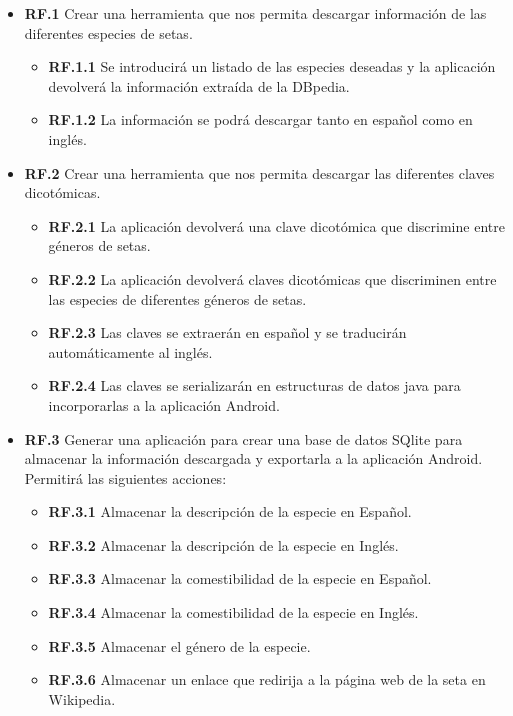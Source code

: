 \begin{itemize}
	\item \textbf{RF.1} Crear una herramienta que nos permita descargar información de las diferentes especies de setas.
	\begin{itemize}
	\item \textbf{RF.1.1} Se introducirá un listado de las especies deseadas y la aplicación devolverá la información extraída de la DBpedia.
	\item \textbf{RF.1.2} La información se podrá descargar tanto en 	español como en inglés.
	\end{itemize}
	
	\item \textbf{RF.2} Crear una herramienta que nos permita descargar las diferentes claves dicotómicas.
	\begin{itemize}
	\item \textbf{RF.2.1} La aplicación devolverá una clave dicotómica que discrimine entre géneros de setas.
	\item \textbf{RF.2.2} La aplicación devolverá claves dicotómicas que discriminen entre las especies de diferentes géneros de setas.
	\item \textbf{RF.2.3} Las claves se extraerán en español y se traducirán automáticamente al inglés.
	\item \textbf{RF.2.4} Las claves se serializarán en estructuras de datos java para incorporarlas a la aplicación Android.
	\end{itemize}
	
	\item \textbf{RF.3} Generar una aplicación para crear una base de datos SQlite para almacenar la información descargada y exportarla a la aplicación Android. Permitirá las siguientes acciones:
	\begin{itemize}
	\item \textbf{RF.3.1} Almacenar la descripción de la especie en Español.
	\item \textbf{RF.3.2} Almacenar la descripción de la especie en Inglés.
	\item \textbf{RF.3.3} Almacenar la comestibilidad de la especie en Español.
	\item \textbf{RF.3.4} Almacenar la comestibilidad de la especie en Inglés.
	\item \textbf{RF.3.5} Almacenar el género de la especie.
	\item \textbf{RF.3.6} Almacenar un enlace que redirija a la página web de la seta en Wikipedia.
	\end{itemize}
	

\end{itemize}
